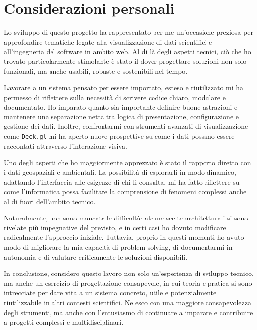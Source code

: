 \section{Considerazioni personali}
\label{ss:considerazioni-personali}

Lo sviluppo di questo progetto ha rappresentato per me un'occasione preziosa per
approfondire tematiche legate alla visualizzazione di dati scientifici e all'ingegneria
del software in ambito web. Al di là degli aspetti tecnici, ciò che ho trovato particolarmente
stimolante è stato il dover progettare soluzioni non solo funzionali, ma anche
usabili, robuste e sostenibili nel tempo.
\vspace{0.5em}

\noindent

Lavorare a un sistema pensato per essere importato, esteso e riutilizzato mi ha permesso
di riflettere sulla necessità di scrivere codice chiaro, modulare e documentato.
Ho imparato quanto sia importante definire buone astrazioni e mantenere una separazione
netta tra logica di presentazione, configurazione e gestione dei dati. Inoltre,
confrontarmi con strumenti avanzati di visualizzazione come \texttt{Deck.gl} mi ha
aperto nuove prospettive su come i dati possano essere raccontati attraverso l'interazione
visiva.

\vspace{0.5em}

\noindent

Uno degli aspetti che ho maggiormente apprezzato è stato il rapporto diretto con
i dati geospaziali e ambientali. La possibilità di esplorarli in modo dinamico, adattando
l'interfaccia alle esigenze di chi li consulta, mi ha fatto riflettere su come l'informatica
possa facilitare la comprensione di fenomeni complessi anche al di fuori dell'ambito
tecnico.

\vspace{0.5em}

\noindent
Naturalmente, non sono mancate le difficoltà: alcune scelte architetturali si sono
rivelate più impegnative del previsto, e in certi casi ho dovuto modificare
radicalmente l'approccio iniziale. Tuttavia, proprio in questi momenti ho avuto
modo di migliorare la mia capacità di problem solving, di documentarmi in autonomia
e di valutare criticamente le soluzioni disponibili.

\vspace{0.5em}

\noindent
In conclusione, considero questo lavoro non solo un'esperienza di sviluppo tecnico,
ma anche un esercizio di progettazione consapevole, in cui teoria e pratica si sono
intrecciate per dare vita a un sistema concreto, utile e potenzialmente
riutilizzabile in altri contesti scientifici. Ne esco con una maggiore consapevolezza
degli strumenti, ma anche con l'entusiasmo di continuare a imparare e
contribuire a progetti complessi e multidisciplinari.
